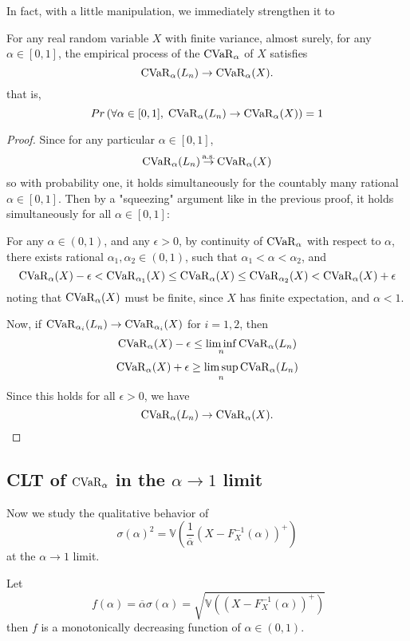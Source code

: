 In fact, with a little manipulation, we immediately strengthen it to 
\begin{theorem}
	\label{theorem:uni_slln}
	For any real random variable $X$ with finite variance, almost surely, for any $\alpha\in[0, 1]$, the empirical process of the $\operatorname{CVaR}_\alpha$ of $X$ satisfies
	\begin{equation}
	\operatorname{CVaR}_\alpha(L_n) \to \operatorname{CVaR}_\alpha(X).
	\end{equation}
	that is, 
	\begin{equation}
		Pr\left(\forall \alpha\in[0, 1], \; \operatorname{CVaR}_\alpha(L_n) \to \operatorname{CVaR}_\alpha(X)\right) = 1
	\end{equation}
\end{theorem}
\begin{proof}
	Since for any particular $\alpha \in[0, 1]$, 
	$$\operatorname{CVaR}_\alpha(L_n) \operatorname*{\stackrel{\text {a.s.}}{\rightarrow}} \operatorname{CVaR}_\alpha(X)$$
	so with probability one, it holds simultaneously for the countably many rational $\alpha\in[0, 1]$. Then by a "squeezing" argument like in the previous proof, it holds simultaneously for all $\alpha \in[0, 1]$:
	
	For any $\alpha \in (0, 1)$, and any $\epsilon > 0$, by continuity of $\operatorname{CVaR}_\alpha$ with respect to $\alpha$, there exists rational $\alpha_1, \alpha_2 \in(0, 1)$, such that $\alpha_1 < \alpha < \alpha_2$, and 
	$$\operatorname{CVaR}_{\alpha}(X) -\epsilon < \operatorname{CVaR}_{\alpha_1}(X)\le \operatorname{CVaR}_{\alpha}(X)\le \operatorname{CVaR}_{\alpha_2}(X) < \operatorname{CVaR}_{\alpha}(X) + \epsilon$$
	noting that $\operatorname{CVaR}_{\alpha}(X)$ must be finite, since $X$ has finite expectation, and $\alpha < 1$. 
	
	Now, if $\operatorname{CVaR}_{\alpha_i}(L_n) \to \operatorname{CVaR}_{\alpha_i}(X)$ for $i = 1, 2$, then 
	$$\operatorname{CVaR}_{\alpha}(X) -\epsilon \le \liminf_n \operatorname{CVaR}_{\alpha}(L_n) $$
	$$\operatorname{CVaR}_{\alpha}(X) +\epsilon \ge \limsup_n \operatorname{CVaR}_{\alpha}(L_n) $$
	Since this holds for all $\epsilon > 0$, we have 
	$$\operatorname{CVaR}_\alpha(L_n) \to \operatorname{CVaR}_\alpha(X).$$
\end{proof}

\subsection{CLT of $\operatorname{CVaR}_\alpha$ in the $\alpha \to 1$ limit}\label{sec:clt_right_tail}
Now we study the qualitative behavior of 
$$\sigma(\alpha)^2 = \mathbb{V}\left(\frac 1{\overbar\alpha} (X - F_X^{-1}(\alpha))^+\right)$$
at the $\alpha \to 1$ limit.

Let 
\begin{equation}
\
f(\alpha) = {\overbar\alpha} \sigma(\alpha) = \sqrt{\mathbb{V}\left( (X - F_X^{-1}(\alpha))^+\right)}
\end{equation}
then $f$ is a monotonically decreasing function of $\alpha \in (0, 1)$. 

